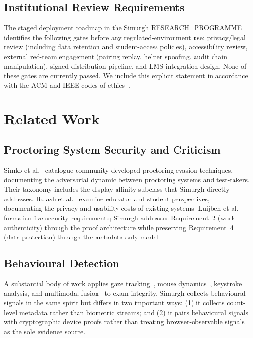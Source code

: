 \documentclass[conference]{IEEEtran}
\begin{document}
\subsection{Institutional Review Requirements}

The staged deployment roadmap in the Simurgh RESEARCH\_PROGRAMME identifies the following gates before any regulated-environment use: privacy/legal review (including data retention and student-access policies), accessibility review, external red-team engagement (pairing replay, helper spoofing, audit chain manipulation), signed distribution pipeline, and LMS integration design. None of these gates are currently passed. We include this explicit statement in accordance with the ACM and IEEE codes of ethics~\cite{acm2018code,ieee2024code}.

\section{Related Work}

\subsection{Proctoring System Security and Criticism}

Simko et al.~\cite{simko2024modern} catalogue community-developed proctoring evasion techniques, documenting the adversarial dynamic between proctoring systems and test-takers. Their taxonomy includes the display-affinity subclass that Simurgh directly addresses. Balash et al.~\cite{balash2023educators,balash2021examining} examine educator and student perspectives, documenting the privacy and usability costs of existing systems. Luijben et al.~\cite{luijben2024security} formalise five security requirements; Simurgh addresses Requirement~2 (work authenticity) through the proof architecture while preserving Requirement~4 (data protection) through the metadata-only model.

\subsection{Behavioural Detection}

A substantial body of work applies gaze tracking~\cite{kaddoura2023computational,ferdosi2023modeling}, mouse dynamics~\cite{wang2020user}, keystroke analysis, and multimodal fusion~\cite{guan2021design,atoum2017automated} to exam integrity. Simurgh collects behavioural signals in the same spirit but differs in two important ways: (1) it collects count-level metadata rather than biometric streams; and (2) it pairs behavioural signals with cryptographic device proofs rather than treating browser-observable signals as the sole evidence source.
\end{document}
